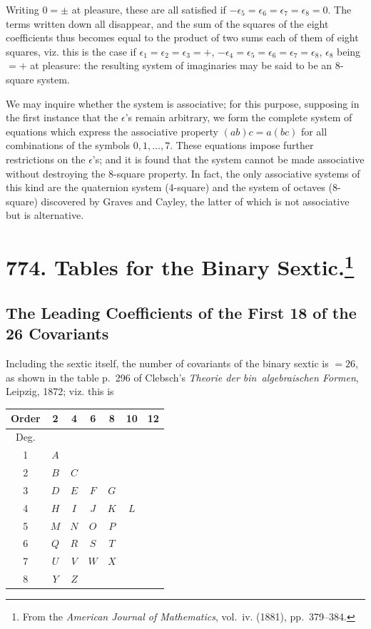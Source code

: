 \documentclass[11pt,a4paper]{article}
\theoremstyle{definition}
\begin{document}
Writing $0 = \pm$ at pleasure, these are all satisfied if $-\epsilon_5 = \epsilon_6 = \epsilon_7 = \epsilon_8 = 0$. The terms written down all disappear, and the sum of the squares of the eight coefficients thus becomes equal to the product of two sums each of them of eight squares, viz. this is the case if $\epsilon_1 = \epsilon_2 = \epsilon_3 = +$, $-\epsilon_4 = \epsilon_5 = \epsilon_6 = \epsilon_7 = \epsilon_8$, $\epsilon_8$ being $= +$ at pleasure: the resulting system of imaginaries may be said to be an 8-square system.

We may inquire whether the system is associative; for this purpose, supposing in the first instance that the $\epsilon$'s remain arbitrary, we form the complete system of equations which express the associative property $(ab)c = a(bc)$ for all combinations of the symbols $0, 1, \dots, 7$. These equations impose further restrictions on the $\epsilon$'s; and it is found that the system cannot be made associative without destroying the 8-square property. In fact, the only associative systems of this kind are the quaternion system (4-square) and the system of octaves (8-square) discovered by Graves and Cayley, the latter of which is not associative but is alternative.

\newpage
\section[Tables for the Binary Sextic]{774. Tables for the Binary Sextic.\footnote{From the \textit{American Journal of Mathematics}, vol.~iv. (1881), pp.~379--384.}}

\subsection*{The Leading Coefficients of the First 18 of the 26 Covariants}

Including the sextic itself, the number of covariants of the binary sextic is $= 26$, as shown in the table p.~296 of Clebsch's \textit{Theorie der bin\ algebraischen Formen}, Leipzig, 1872; viz. this is

\begin{center}
\begin{tabular}{c|cccccc}
\toprule
Order & 2 & 4 & 6 & 8 & 10 & 12 \\
\midrule
Deg. & & & & & & \\
1 & $A$ & & & & & \\
2 & $B$ & $C$ & & & & \\
3 & $D$ & $E$ & $F$ & $G$ & & \\
4 & $H$ & $I$ & $J$ & $K$ & $L$ & \\
5 & $M$ & $N$ & $O$ & $P$ & & \\
6 & $Q$ & $R$ & $S$ & $T$ & & \\
7 & $U$ & $V$ & $W$ & $X$ & & \\
8 & $Y$ & $Z$ & & & & \\
\bottomrule
\end{tabular}
\end{center}
\end{document}
